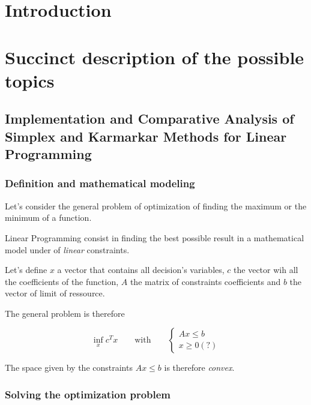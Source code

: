 \documentclass[12pt, openany]{article}
\begin{document}
\clearpage %


\tableofcontents

\newpage

\section{Introduction}

\section{Succinct description of the possible topics}

\subsection{Implementation and Comparative Analysis of Simplex and Karmarkar Methods for Linear Programming}

\subsubsection{Definition and mathematical modeling}

Let's consider the general problem of optimization of finding the maximum or the minimum of a function.

Linear Programming consist in finding the best possible result in a mathematical model under of \emph{linear} constraints.

Let's define $x$ a vector that contains all decision's variables, $c$ the vector wih all the coefficients of the function, $A$ the matrix of constraints coefficients and $b$ the vector of limit of ressource.

The general problem is therefore 

\begin{equation}
    \inf_x c^T x \qquad \text{with}  \qquad \begin{cases}
        Ax\leq b\\
        x \geq 0 (?)
    \end{cases}
\end{equation}

The space given by the constraints $Ax\leq b$ is therefore \emph{convex}.

\subsubsection{Solving the optimization problem}
\end{document}

